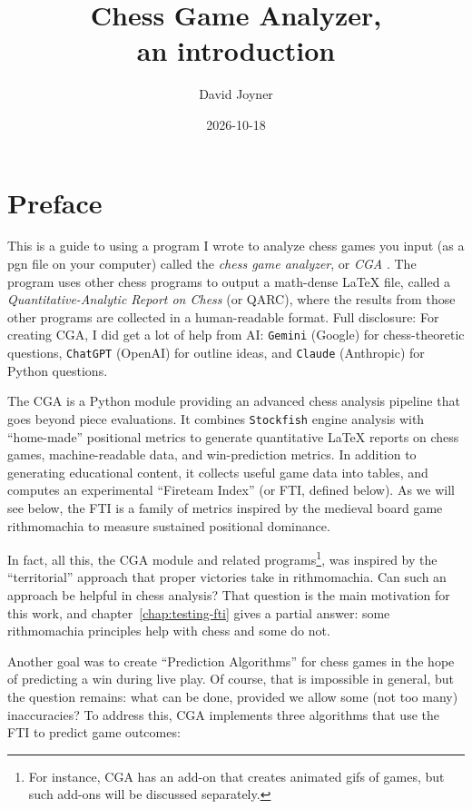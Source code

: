 \documentclass[12pt]{book}
\title{Chess Game Analyzer,\\
an introduction}
\author{David Joyner}
\date{2026-10-18}
\begin{document}
\maketitle

\tableofcontents

\newpage


\chapter*{Preface}

This is a guide to using a program I wrote to
analyze chess games you input (as a pgn file on your computer)
called the {\it chess game analyzer}, or {\it CGA} \cite{CGA26}.
The program uses other chess programs to output a
math-dense LaTeX file, called a
{\it Quantitative-Analytic Report on Chess} (or QARC),
where the results from those other programs are collected
in a human-readable format. Full disclosure: For creating CGA,
I did get a lot of help from AI: {\tt Gemini} (Google) for
chess-theoretic questions, {\tt ChatGPT} (OpenAI) for outline ideas,
and {\tt Claude} (Anthropic) for Python questions.

The CGA is a Python module providing
an advanced chess analysis pipeline that goes beyond piece
evaluations. It combines {\tt Stockfish} engine analysis with
``home-made'' positional metrics to generate quantitative
LaTeX reports on chess games, machine-readable data, and
win-prediction metrics.
In addition to generating educational content, it collects
useful game data into tables, and computes
an experimental ``Fireteam Index'' (or FTI, defined below).
As we will see below, the FTI is a family of metrics inspired by
the medieval board game rithmomachia \cite{Ri25} to measure
sustained positional dominance.

In fact, all this, the CGA module and related
programs\footnote{For instance, CGA has an add-on that creates
animated gifs of games, but such add-ons will be discussed separately.},
was inspired by the ``territorial'' approach that proper
victories take in rithmomachia. Can such an approach be helpful in
chess analysis? That question is the main motivation for this work, and
chapter~\ref{chap:testing-fti} gives a partial answer: some rithmomachia
principles help with chess and some do not.

Another goal was to create ``Prediction Algorithms'' for chess games
in the hope of predicting a win during live play.
Of course, that is impossible in general, but the question remains:
what can be done,
provided we allow some (not too many) inaccuracies?
To address this, CGA implements three algorithms that use the FTI to
predict game outcomes:
\end{document}
